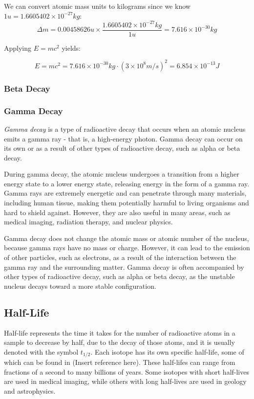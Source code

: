 \begin{mdframed}[backgroundcolor=blue!10!white]
We can convert atomic mass units to kilograms since we know $1 \si{u} = 1.6605402 \times 10^{-27} \si{kg}$:
\begin{equation*}
\Delta m =  0.00458626 \si{u} \times \frac{1.6605402 \times 10^{-27} \si{kg}}{1\si{u}} = 7.616 \times 10^{-30} \si{kg}
\end{equation*}

Applying $E = mc^2$ yields:

\begin{equation}
E = m c ^2 = 7.616 \times 10^{-30} \si{kg} \cdot (3 \times 10^8 \si{m/s})^2  = \boxed{6.854\times 10^{-13} \si{J}}
\end{equation}
	
\end{mdframed}




\subsubsection{Beta Decay}
\subsubsection{Gamma Decay}
\textit{Gamma decay} is a type of radioactive decay that occurs when an atomic nucleus emits a gamma ray - that is, a high-energy photon.  Gamma decay can occur on its own or as a result of other types of radioactive decay, such as alpha or beta decay.

During gamma decay, the atomic nucleus undergoes a transition from a higher energy state to a lower energy state, releasing energy in the form of a gamma ray. Gamma rays are extremely energetic and can penetrate through many materials, including human tissue, making them potentially harmful to living organisms and hard to shield against.  However, they are also useful in many areas, such as medical imaging, radiation therapy, and nuclear physics.

Gamma decay does not change the atomic mass or atomic number of the nucleus, because gamma rays have no mass or charge. However, it can lead to the emission of other particles, such as electrons, as a result of the interaction between the gamma ray and the surrounding matter. Gamma decay is often accompanied by other types of radioactive decay, such as alpha or beta decay, as the unstable nucleus decays toward a more stable configuration.


\subsection{Half-Life}
Half-life represents the time it takes for the number of radioactive atoms in a sample to decrease by half, due to the decay of those atoms, and it is usually denoted with the symbol $t_{1/2}$.  Each isotope has its own specific half-life, some of which can be found in (Insert reference here).  These half-lifes can range from fractions of a second to many billions of years.  Some isotopes with short half-lives are used in medical imaging, while others with long half-lives are used in geology and astrophysics.

